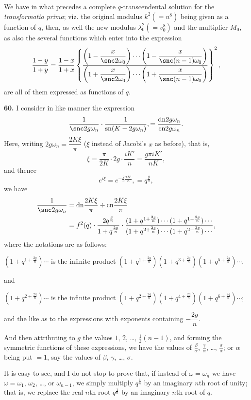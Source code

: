 \documentclass[11pt,a4paper]{book}
\providecommand{\sn}{\mathrm{sn}}
\providecommand{\cn}{\mathrm{cn}}
\providecommand{\dn}{\mathrm{dn}}
\begin{document}
We have in what precedes a complete $q$-transcendental solution for the \textit{transformatio prima}; viz. the original modulus $k^2 (= u^8)$ being given as a function of $q$, then, as well the new modulus $\lambda_0^2 (= v_0^8)$ and the multiplier $M_0$, as also the several functions which enter into the expression
\[
\frac{1 - y}{1 + y} = \frac{1 - x}{1 + x}
\left\{
\frac{\left(1 - \dfrac{x}{\snc 2\omega_0}\right) \cdots
\left(1 - \dfrac{x}{\snc (n-1)\omega_0}\right)}
{\left(1 + \dfrac{x}{\snc 2\omega_0}\right) \cdots
\left(1 + \dfrac{x}{\snc (n-1)\omega_0}\right)}
\right\}^2,
\]
are all of them expressed as functions of $q$.

\textbf{60.} I consider in like manner the expression
\[
\frac{1}{\snc 2g\omega_n} \cdot \frac{1}{\sn(K - 2g\omega_n)},
= \frac{\dn 2g\omega_n}{\cn 2g\omega_n}.
\]
Here, writing $2g\omega_n = \dfrac{2K\xi}{\pi}$ ($\xi$ instead of Jacobi's $x$ as before), that is,
\[
\xi = \frac{\pi}{2K} \cdot 2g \cdot \frac{iK'}{n} = \frac{g\pi iK'}{nK},
\]
and thence
\[
e^{i\xi} = e^{-\frac{g}{n}\frac{\pi K'}{K}}, = q^{\frac{g}{n}},
\]
we have
\begin{align*}
\frac{1}{\snc 2g\omega_n}
&= \dn \frac{2K\xi}{\pi} \div \cn \frac{2K\xi}{\pi} \\
&= f^2(q) \cdot \frac{2q^{\frac{g}{n}}}{1 + q^{\frac{2g}{n}}} \cdot
\frac{(1 + q^{1 + \frac{2g}{n}}) \cdots (1 + q^{1 - \frac{2g}{n}}) \cdots}
{(1 + q^{2 + \frac{2g}{n}}) \cdots (1 + q^{2 - \frac{2g}{n}}) \cdots},
\end{align*}
where the notations are as follows:

$(1 + q^{1 + \frac{2g}{n}}) \cdots$ is the infinite product $(1 + q^{1 + \frac{2g}{n}})(1 + q^{3 + \frac{2g}{n}})(1 + q^{5 + \frac{2g}{n}}) \cdots$,

and

$(1 + q^{2 + \frac{2g}{n}}) \cdots$ is the infinite product $(1 + q^{2 + \frac{2g}{n}})(1 + q^{4 + \frac{2g}{n}})(1 + q^{6 + \frac{2g}{n}}) \cdots$;

and the like as to the expressions with exponents containing $-\dfrac{2g}{n}$.

And then attributing to $g$ the values $1$, $2$, \ldots, $\frac{1}{2}(n-1)$, and forming the symmetric functions of these expressions, we have the values of $\frac{\beta}{\alpha}$, $\frac{\gamma}{\alpha}$, \ldots, $\frac{\sigma}{\alpha}$; or $\alpha$ being put $= 1$, say the values of $\beta$, $\gamma$, \ldots, $\sigma$.

It is easy to see, and I do not stop to prove that, if instead of $\omega = \omega_n$ we have $\omega = \omega_1$, $\omega_2$, \ldots, or $\omega_{n-1}$, we simply multiply $q^{\frac{1}{n}}$ by an imaginary $n$th root of unity; that is, we replace the real $n$th root $q^{\frac{1}{n}}$ by an imaginary $n$th root of $q$.
\end{document}
